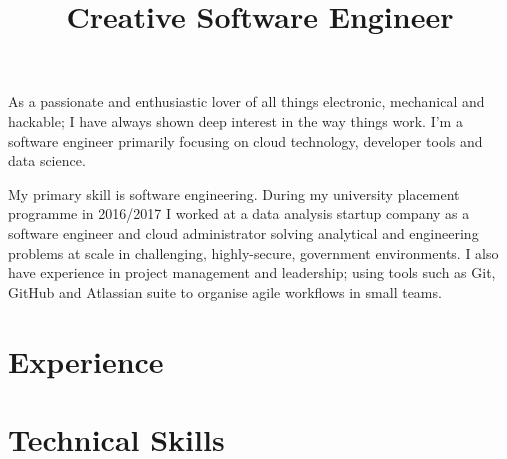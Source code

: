\documentclass[10pt,a4paper,sans]{moderncv}
\title{Creative Software Engineer}
\begin{document}
\makecvtitle

%
%

As a passionate and enthusiastic lover of all things electronic, mechanical and hackable; I have always shown deep interest in the way things work. I'm a software engineer primarily focusing on cloud technology, developer tools and data science.\newline{}

My primary skill is software engineering. During my university placement programme in 2016/2017 I worked at a data analysis startup company as a software engineer and cloud administrator solving analytical and engineering problems at scale in challenging, highly-secure, government environments. I also have experience in project management and leadership; using tools such as Git, GitHub and Atlassian suite to organise agile workflows in small teams.

%
%

\section{Experience}

%
%

\section{Technical Skills}
\begin{cvcolumns}
\end{cvcolumns}
\end{document}
